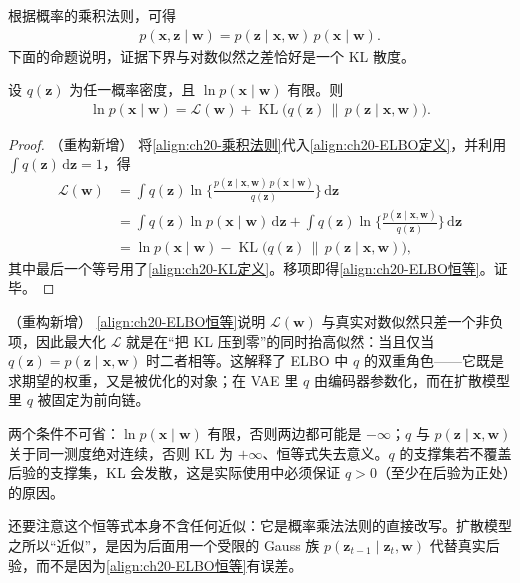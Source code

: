 \documentclass[../../main.tex]{subfiles}
\begin{document}
根据概率的乘积法则，可得
\begin{align}
p(\bm{x},\bm{z}\mid\bm{w})=p(\bm{z}\mid\bm{x},\bm{w})\,p(\bm{x}\mid\bm{w}).
\label{align:ch20-乘积法则}
\end{align}
下面的命题说明，证据下界与对数似然之差恰好是一个 KL 散度。

\begin{proposition}[证据下界恒等式]\label{proposition:ch20-ELBO恒等}
设 $q(\bm{z})$ 为任一概率密度，且 $\ln p(\bm{x}\mid\bm{w})$ 有限。则
\begin{align}
\ln p(\bm{x}\mid\bm{w})=\mathcal{L}(\bm{w})+\operatorname{KL}\big(q(\bm{z})\,\|\,p(\bm{z}\mid\bm{x},\bm{w})\big).
\label{align:ch20-ELBO恒等}
\end{align}
\end{proposition}

\begin{proof}（重构新增）
将\eqref{align:ch20-乘积法则}代入\eqref{align:ch20-ELBO定义}，并利用 $\int q(\bm{z})\,\mathrm{d}\bm{z}=1$，得
\begin{align*}
\mathcal{L}(\bm{w})&=\int q(\bm{z})\ln\Big\{\frac{p(\bm{z}\mid\bm{x},\bm{w})\,p(\bm{x}\mid\bm{w})}{q(\bm{z})}\Big\}\,\mathrm{d}\bm{z}\\
&=\int q(\bm{z})\ln p(\bm{x}\mid\bm{w})\,\mathrm{d}\bm{z}+\int q(\bm{z})\ln\Big\{\frac{p(\bm{z}\mid\bm{x},\bm{w})}{q(\bm{z})}\Big\}\,\mathrm{d}\bm{z}\\
&=\ln p(\bm{x}\mid\bm{w})-\operatorname{KL}\big(q(\bm{z})\,\|\,p(\bm{z}\mid\bm{x},\bm{w})\big),
\end{align*}
其中最后一个等号用了\eqref{align:ch20-KL定义}。移项即得\eqref{align:ch20-ELBO恒等}。证毕。
\end{proof}

\begin{remark}（重构新增）
\eqref{align:ch20-ELBO恒等}说明 $\mathcal{L}(\bm{w})$ 与真实对数似然只差一个非负项，因此最大化 $\mathcal{L}$ 就是在“把 KL 压到零”的同时抬高似然：当且仅当 $q(\bm{z})=p(\bm{z}\mid\bm{x},\bm{w})$ 时二者相等。这解释了 ELBO 中 $q$ 的双重角色——它既是求期望的权重，又是被优化的对象；在 VAE 里 $q$ 由编码器参数化，而在扩散模型里 $q$ 被固定为前向链。\par
两个条件不可省：$\ln p(\bm{x}\mid\bm{w})$ 有限，否则两边都可能是 $-\infty$；$q$ 与 $p(\bm{z}\mid\bm{x},\bm{w})$ 关于同一测度绝对连续，否则 KL 为 $+\infty$、恒等式失去意义。$q$ 的支撑集若不覆盖后验的支撑集，KL 会发散，这是实际使用中必须保证 $q>0$（至少在后验为正处）的原因。\par
还要注意这个恒等式本身不含任何近似：它是概率乘法法则的直接改写。扩散模型之所以“近似”，是因为后面用一个受限的 Gauss 族 $p(\bm{z}_{t-1}\mid\bm{z}_t,\bm{w})$ 代替真实后验，而不是因为\eqref{align:ch20-ELBO恒等}有误差。
\end{remark}
\end{document}

